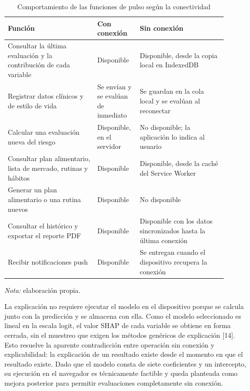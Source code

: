 \documentclass[conference]{IEEEtran}
\begin{document}
\begin{table}[!t]
\centering
\caption{Comportamiento de las funciones de pulso según la conectividad}
\footnotesize
\renewcommand{\arraystretch}{1.15}
\begin{tabular}{>{\raggedright\arraybackslash}p{0.383\linewidth}>{\raggedright\arraybackslash}p{0.131\linewidth}>{\raggedright\arraybackslash}p{0.376\linewidth}}
\hline
\textbf{Función} & \textbf{Con conexión} & \textbf{Sin conexión} \\ \hline
Consultar la última evaluación y la contribución de cada variable & Disponible & Disponible, desde la copia local en IndexedDB \\ \hline
Registrar datos clínicos y de estilo de vida & Se envían y se evalúan de inmediato & Se guardan en la cola local y se evalúan al reconectar \\ \hline
Calcular una evaluación nueva del riesgo & Disponible, en el servidor & No disponible; la aplicación lo indica al usuario \\ \hline
Consultar plan alimentario, lista de mercado, rutinas y hábitos & Disponible & Disponible, desde la caché del Service Worker \\ \hline
Generar un plan alimentario o una rutina nuevos & Disponible & No disponible \\ \hline
Consultar el histórico y exportar el reporte PDF & Disponible & Disponible con los datos sincronizados hasta la última conexión \\ \hline
Recibir notificaciones push & Disponible & Se entregan cuando el dispositivo recupera la conexión \\ \hline
\end{tabular}
\par\smallskip\parbox{\linewidth}{\scriptsize\textit{Nota:} elaboración propia.}
\end{table}
La explicación no requiere ejecutar el modelo en el dispositivo porque se calcula junto con la predicción y se almacena con ella. Como el modelo seleccionado es lineal en la escala logit, el valor SHAP de cada variable se obtiene en forma cerrada, sin el muestreo que exigen los métodos genéricos de explicación [14]. Esto resuelve la aparente contradicción entre operación sin conexión y explicabilidad: la explicación de un resultado existe desde el momento en que el resultado existe. Dado que el modelo consta de siete coeficientes y un intercepto, su ejecución en el navegador es técnicamente factible y queda planteada como mejora posterior para permitir evaluaciones completamente sin conexión.
\end{document}
